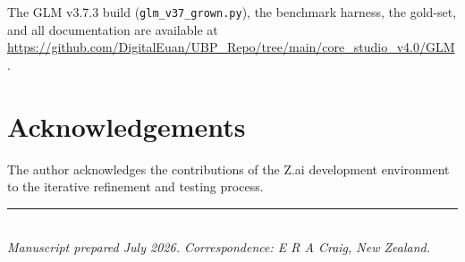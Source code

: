 \documentclass[11pt,a4paper]{article}
\begin{document}
The GLM v3.7.3 build (\texttt{glm\_v37\_grown.py}), the benchmark harness, the gold-set, and all documentation are available at \url{https://github.com/DigitalEuan/UBP_Repo/tree/main/core_studio_v4.0/GLM}.

\section*{Acknowledgements}

The author acknowledges the contributions of the Z.ai development environment to the iterative refinement and testing process.

\vspace{2em}
\noindent\rule{\textwidth}{0.4pt}\\
\small\textit{Manuscript prepared July 2026. Correspondence: E R A Craig, New Zealand.}
\end{document}
